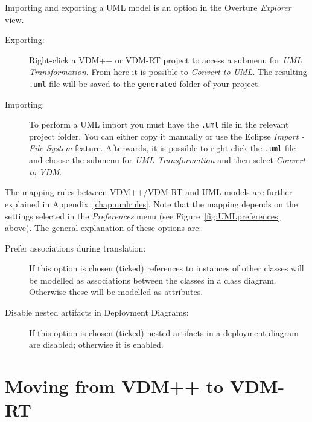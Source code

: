 \documentclass{overturerepchap}
\begin{document}
Importing and exporting a UML model is
an option in the Overture \emph{Explorer} view.
\begin{description}
    \item[Exporting:] Right-click a VDM++ or VDM-RT project to access a submenu
        for \emph{UML Transformation}. From here it is possible to
        \emph{Convert to UML}. The resulting \texttt{.uml} 
        file will be saved to the \texttt{generated} folder of your project.
    
    \item[Importing:] To perform a UML import you must have the \texttt{.uml} 
        file in the relevant project folder. You can either copy it manually or
        use the Eclipse \emph{Import - File System} feature. Afterwards, it
        is possible to right-click the \texttt{.uml} file and choose the
        submenu for \emph{UML Transformation} and
        then select \emph{Convert to VDM}. 

\end{description}

The mapping rules between VDM++/VDM-RT and UML models are further explained 
in Appendix~\ref{chap:umlrules}. Note that the mapping depends on the settings
selected in the \emph{Preferences} menu (see Figure~\ref{fig:UMLpreferences} 
above). The general explanation of these options are:

\begin{description}
\item[Prefer associations during translation:] If this option is chosen 
(ticked) references to instances of other classes will be modelled as
associations between the classes in a class diagram. Otherwise these will be 
modelled as attributes.
\item[Disable nested artifacts in Deployment Diagrams:] If this option
is chosen (ticked) nested artifacts in a deployment diagram are disabled; 
otherwise it is enabled.
\end{description}

\chapter{Moving from VDM++ to VDM-RT}\label{sec:ToVDMRT}
\end{document}

